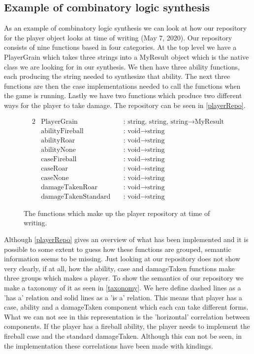 \subsection{Example of combinatory logic synthesis}
As an example of combinatory logic synthesis we can look at how our repository for the player object looks at time of writing (May 7, 2020). Our repository consists of nine functions based in four categories. At the top level we have a PlayerGrain which takes three strings into a MyResult object which is the native class we are looking for in our synthesis. We then have three ability functions, each producing the string needed to synthesize that ability. The next three functions are then the case implementations needed to call the functions when the game is running. Lastly we have two functions which produce two different ways for the player to take damage. The repository can be seen in \autoref{playerRepo}.
\begin{figure}[H]
	\centering
	\begin{alignat*}{2}
	&\text{PlayerGrain}\; &&\text{: string, string, string} \to \text{MyResult}\\
	&\text{abilityFireball}\; &&\text{: void} \to \text{string}\\
	&\text{abilityRoar}\; &&\text{: void} \to \text{string}\\
	&\text{abilityNone}\; &&\text{: void} \to \text{string}\\
	&\text{caseFireball}\; &&\text{: void} \to \text{string}\\
	&\text{caseRoar}\; &&\text{: void} \to \text{string}\\
	&\text{caseNone}\; &&\text{: void} \to \text{string}\\
	&\text{damageTakenRoar}\; &&\text{: void} \to \text{string}\\
	&\text{damageTakenStandard}\; &&\text{: void} \to \text{string}
	\end{alignat*}
	\caption{The functions which make up the player repository at time of writing.}
	\label{playerRepo}
\end{figure}
Although \autoref{playerRepo} gives an overview of what has been implemented and it is possible to some extent to guess how these functions are grouped, semantic information seems to be missing. Just looking at our repository does not show very clearly, if at all, how the ability, case and damageTaken functions make three groups which makes a player. To show the semantics of our repository we make a taxonomy of it as seen in \autoref{taxonomy}. We here define dashed lines as a 'has a' relation and solid lines as a 'is a' relation. This means that player has a case, ability and a damageTaken component which each can take different forms. What we can not see in this representation is the 'horizontal' correlation between components. If the player has a fireball ability, the player needs to implement the fireball case and the standard damageTaken. Although this can not be seen, in the implementation these correlations have been made with kindings.

